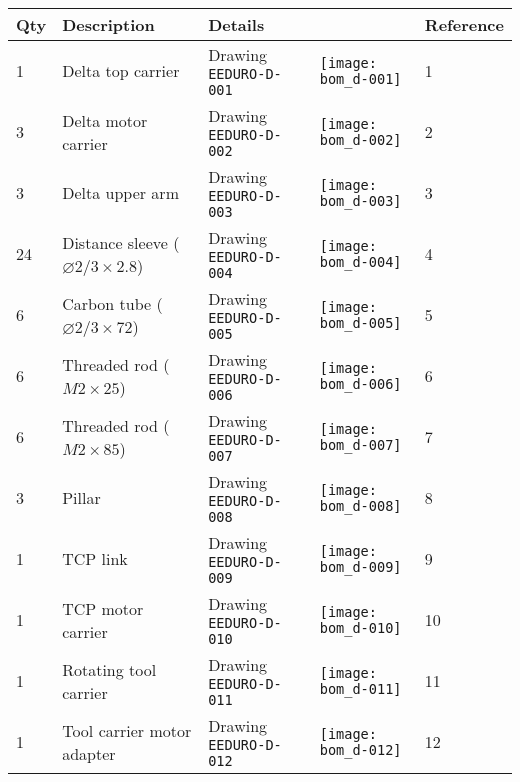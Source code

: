 \begin{tabular}{m{0.5cm} m{5cm} m{5cm} m{1cm} m{1.5cm}}
\bfseries Qty & \bfseries Description               & \bfseries Details                &                                                   & \bfseries Reference \\
\hline
1    & Delta top carrier                            & Drawing \texttt{EEDURO-D-001}    & \texttt{[image: bom\_d-001]}           & 1    \\
\hline
3    & Delta motor carrier                          & Drawing \texttt{EEDURO-D-002}    & \texttt{[image: bom\_d-002]}           & 2    \\
\hline
3    & Delta upper arm                              & Drawing \texttt{EEDURO-D-003}    & \texttt{[image: bom\_d-003]}           & 3    \\
\hline
24   & Distance sleeve ($\varnothing 2/3\times2.8$) & Drawing \texttt{EEDURO-D-004}    & \texttt{[image: bom\_d-004]}           & 4    \\
\hline
6    & Carbon tube ($\varnothing 2/3\times72$)      & Drawing \texttt{EEDURO-D-005}    & \texttt{[image: bom\_d-005]}           & 5    \\
\hline
6    & Threaded rod ($M2\times25$)                  & Drawing \texttt{EEDURO-D-006}    & \texttt{[image: bom\_d-006]}           & 6    \\
\hline
6    & Threaded rod ($M2\times85$)                  & Drawing \texttt{EEDURO-D-007}    & \texttt{[image: bom\_d-007]}           & 7    \\
\hline
3    & Pillar                                       & Drawing \texttt{EEDURO-D-008}    & \texttt{[image: bom\_d-008]}           & 8    \\
\hline
1    & TCP link                                     & Drawing \texttt{EEDURO-D-009}    & \texttt{[image: bom\_d-009]}           & 9    \\
\hline
1    & TCP motor carrier                            & Drawing \texttt{EEDURO-D-010}    & \texttt{[image: bom\_d-010]}           & 10    \\
\hline
1    & Rotating tool carrier                        & Drawing \texttt{EEDURO-D-011}    & \texttt{[image: bom\_d-011]}           & 11    \\
\hline
1    & Tool carrier motor adapter                   & Drawing \texttt{EEDURO-D-012}    & \texttt{[image: bom\_d-012]}           & 12    \\

\end{tabular}
